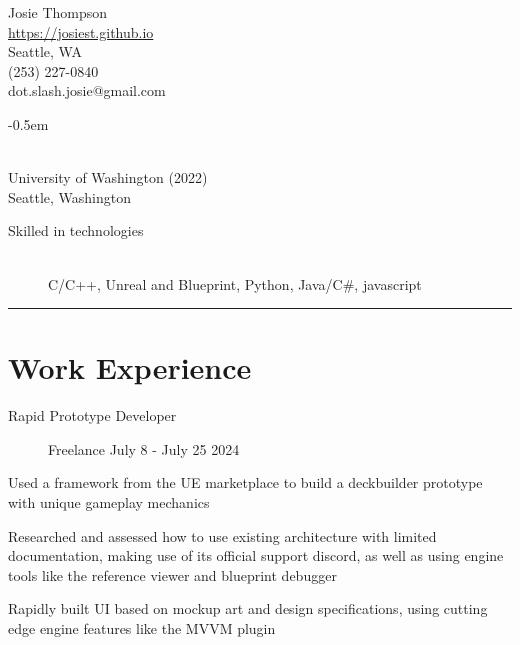 \documentclass[10pt]{article}
\newenvironment{itemize*}
{\begin{itemize}[leftmargin=*]
    \setlength{\parskip}{0.5pt}}
{\end{itemize}}
\begin{document}
\begin{paracol}{2}
\noindent
\parbox[t]{0.5\textwidth}{
    {\sffamily\Huge Josie Thompson}\medskip\\
    \url{https://josiest.github.io}\\
    Seattle, WA\\
    (253) 227-0840\\
    dot.slash.josie@gmail.com
}
\switchcolumn

\begin{description}
\itemsep -0.5em
\item[B.S. in Computer Science] \hfill \\
    University of Washington (2022)\\
    Seattle, Washington
\end{description}

\begin{description}
\item[Skilled in technologies] \hfill \\
C/C++, Unreal and Blueprint, Python, Java/C\#, javascript
\end{description}

\end{paracol}
\vspace{12pt}
\hrule

\section*{Work Experience}

\begin{description}
\item[Rapid Prototype Developer] Freelance \hfill July 8 - July 25 2024
\end{description}

\begin{itemize*}
\item Used a framework from the UE marketplace to build a deckbuilder prototype
      with unique gameplay mechanics
\item Researched and assessed how to use existing architecture with limited
      documentation, making use of its official support discord, as well as
      using engine tools like the reference viewer and blueprint debugger
\item Rapidly built UI based on mockup art and design specifications, using
      cutting edge engine features like the MVVM plugin
\end{itemize*}
\end{document}
